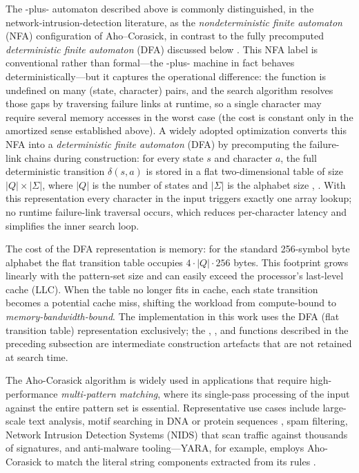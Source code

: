 The -plus- automaton described above is commonly distinguished, in the network-intrusion-detection literature, as the \textit{nondeterministic finite automaton} (NFA) configuration of Aho--Corasick, in contrast to the fully precomputed \textit{deterministic finite automaton} (DFA) discussed below \cite{Qu2016MPI}. This NFA label is conventional rather than formal---the -plus- machine in fact behaves deterministically---but it captures the operational difference: the  function is undefined on many (state, character) pairs, and the search algorithm resolves those gaps by traversing failure links at runtime, so a single character may require several memory accesses in the worst case (the cost is constant only in the amortized sense established above). A widely adopted optimization converts this NFA into a \textit{deterministic finite automaton} (DFA) by precomputing the failure-link chains during construction: for every state $s$ and character $a$, the full deterministic transition $\delta(s,a)$ is stored in a flat two-dimensional table of size $|Q| \times |\Sigma|$, where $|Q|$ is the number of states and $|\Sigma|$ is the alphabet size \cite{AhoCorasick1975}, \cite{Gusfield1997}. With this representation every character in the input triggers exactly one array lookup; no runtime failure-link traversal occurs, which reduces per-character latency and simplifies the inner search loop.

The cost of the DFA representation is memory: for the standard 256-symbol byte alphabet the flat transition table occupies $4 \cdot |Q| \cdot 256$ bytes. This footprint grows linearly with the pattern-set size and can easily exceed the processor's last-level cache (LLC). When the table no longer fits in cache, each state transition becomes a potential cache miss, shifting the workload from compute-bound to \textit{memory-bandwidth-bound}. The implementation in this work uses the DFA (flat transition table) representation exclusively; the , , and  functions described in the preceding subsection are intermediate construction artefacts that are not retained at search time.


The Aho-Corasick algorithm is widely used in applications that require high-performance \textit{multi-pattern matching}, where its single-pass processing of the input against the entire pattern set is essential. Representative use cases include large-scale text analysis, motif searching in DNA or protein sequences \cite{Vajira2018}, spam filtering, Network Intrusion Detection Systems (NIDS) that scan traffic against thousands of signatures, and anti-malware tooling---YARA, for example, employs Aho-Corasick to match the literal string components extracted from its rules \cite{YARADocs}.

